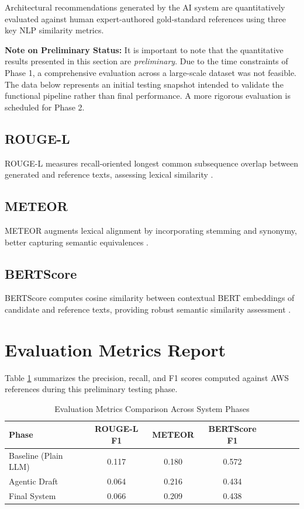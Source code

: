 Architectural recommendations generated by the AI system are quantitatively evaluated against human expert-authored gold-standard references using three key NLP similarity metrics. 

\textbf{Note on Preliminary Status:} It is important to note that the quantitative results presented in this section are \textit{preliminary}. Due to the time constraints of Phase 1, a comprehensive evaluation across a large-scale dataset was not feasible. The data below represents an initial testing snapshot intended to validate the functional pipeline rather than final performance. A more rigorous evaluation is scheduled for Phase 2.

\subsection{ROUGE-L}

ROUGE-L measures recall-oriented longest common subsequence overlap between generated and reference texts, assessing lexical similarity \cite{lin2004rouge}.

\subsection{METEOR}

METEOR augments lexical alignment by incorporating stemming and synonymy, better capturing semantic equivalences \cite{banerjee2005meteor}.

\subsection{BERTScore}

BERTScore computes cosine similarity between contextual BERT embeddings of candidate and reference texts, providing robust semantic similarity assessment \cite{zhang2019bertscore}.

\section{Evaluation Metrics Report}

Table \ref{tab:evaluation-metrics} summarizes the precision, recall, and F1 scores computed against AWS references during this preliminary testing phase.

\begin{table}[h]
\centering
\caption{Evaluation Metrics Comparison Across System Phases}
\label{tab:evaluation-metrics}
\begin{tabular}{lccccccc}
\toprule
Phase           & ROUGE-L F1 & METEOR & BERTScore F1 \\
\midrule
Baseline (Plain LLM) & 0.117 & 0.180 & 0.572 \\
Agentic Draft        & 0.064 & 0.216 & 0.434 \\
Final System         & 0.066 & 0.209 & 0.438 \\
\bottomrule
\end{tabular}
\end{table}

